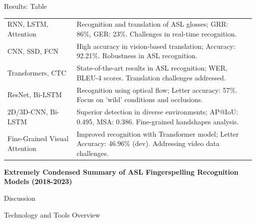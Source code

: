 \documentclass{beamer} %
\begin{document}
\begin{frame}[t]
\begin{columns}[t]
\begin{column}{0.3\textwidth}
\begin{block}{Results: Table}
\begin{footnotesize}
\begin{tabular}{p{} p{} p{}}
						RNN, LSTM, Attention          & Recognition and translation of ASL glosses; GRR: 86\%, GER: 23\%. Challenges in real-time recognition.         & \cite{skumarTimeSeriesNeural2018}                  \\
						CNN, SSD, FCN                 & High accuracy in vision-based translation; Accuracy: 92.21\%. Robustness in ASL recognition.                   & \cite{abiyevReconstructionConvolutionalNeural2020} \\
						Transformers, CTC             & State-of-the-art results in ASL recognition; WER, BLEU-4 scores. Translation challenges addressed.             & \cite{cihancamgozSignLanguageTransformers2020}     \\
						ResNet, Bi-LSTM               & Recognition using optical flow; Letter accuracy: 57\%. Focus on 'wild' conditions and occlusions.              & \cite{kabadeAmericanSignLanguage2023}              \\
						2D/3D-CNN, Bi-LSTM            & Superior detection in diverse environments; AP@IoU: 0.495, MSA: 0.386. Fine-grained handshapes analysis.       & \cite{shiFingerspellingDetectionAmerican2021}      \\
						Fine-Grained Visual Attention & Improved recognition with Transformer model; Letter Accuracy: 46.96\% (dev). Addressing video data challenges. & \cite{gajurelFineGrainedVisualAttention2021}       \\

						\bottomrule
					\end{tabular}
					\centering\textbf{Extremely Condensed Summary of ASL Fingerspelling Recognition Models (2018-2023)}

				\end{footnotesize}
			\end{block}


			\begin{block}{Discussion}
			\end{block}


			\begin{block}{Technology and Tools Overview}
			\end{block}


\end{column}
\end{columns}
\end{frame}
\end{document}
